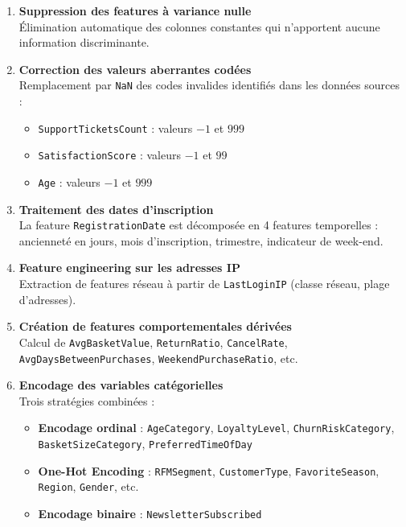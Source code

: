 \documentclass[12pt,a4paper]{article}
\begin{document}
\begin{enumerate}[label=\textbf{Étape \arabic*.}]

  \item \textbf{Suppression des features à variance nulle} \\
  Élimination automatique des colonnes constantes qui n'apportent aucune information discriminante.

  \item \textbf{Correction des valeurs aberrantes codées} \\
  Remplacement par \texttt{NaN} des codes invalides identifiés dans les données sources :
  \begin{itemize}
    \item \texttt{SupportTicketsCount} : valeurs $-1$ et $999$
    \item \texttt{SatisfactionScore} : valeurs $-1$ et $99$
    \item \texttt{Age} : valeurs $-1$ et $999$
  \end{itemize}

  \item \textbf{Traitement des dates d'inscription} \\
  La feature \texttt{RegistrationDate} est décomposée en 4 features temporelles :
  ancienneté en jours, mois d'inscription, trimestre, indicateur de week-end.

  \item \textbf{Feature engineering sur les adresses IP} \\
  Extraction de features réseau à partir de \texttt{LastLoginIP} (classe réseau, plage d'adresses).

  \item \textbf{Création de features comportementales dérivées} \\
  Calcul de \texttt{AvgBasketValue}, \texttt{ReturnRatio}, \texttt{CancelRate},
  \texttt{AvgDaysBetweenPurchases}, \texttt{WeekendPurchaseRatio}, etc.

  \item \textbf{Encodage des variables catégorielles} \\
  Trois stratégies combinées :
  \begin{itemize}
    \item \textbf{Encodage ordinal} : \texttt{AgeCategory}, \texttt{LoyaltyLevel},
          \texttt{ChurnRiskCategory}, \texttt{BasketSizeCategory}, \texttt{PreferredTimeOfDay}
    \item \textbf{One-Hot Encoding} : \texttt{RFMSegment}, \texttt{CustomerType},
          \texttt{FavoriteSeason}, \texttt{Region}, \texttt{Gender}, etc.
    \item \textbf{Encodage binaire} : \texttt{NewsletterSubscribed}
  \end{itemize}
\end{enumerate}
\end{document}
